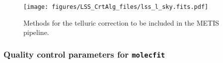 \begin{figure}[ht]
  \centering
  \texttt{[image: figures/LSS\_CrtAlg\_files/lss\_l\_sky.fits.pdf]}
    \caption[Methods for the telluric correction to be included in the METIS pipeline]{%
        Methods for the telluric correction to be included in the \ac{METIS} pipeline.}
  \label{Fig:lss_sim}
\end{figure}
\subsubsection{Quality control parameters for \texttt{molecfit}}\label{ssec:tellcorr_qc_params}



